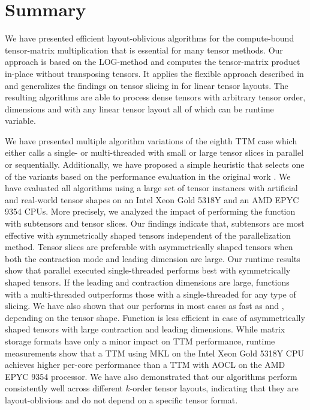 \section{Summary}
\label{sec:summary}
We have presented efficient layout-oblivious algorithms for the compute-bound tensor-matrix multiplication that is essential for many tensor methods.
Our approach is based on the LOG-method and computes the tensor-matrix product in-place without transposing tensors.
It applies the flexible approach described in \cite{bassoy:2019:ttv} and generalizes the findings on tensor slicing in \cite{li:2015:input} for linear tensor layouts.
The resulting algorithms are able to process dense tensors with arbitrary tensor order, dimensions and with any linear tensor layout all of which can be runtime variable.

We have presented multiple algorithm variations of the eighth TTM case which either calls a single- or multi-threaded  with small or large tensor slices in parallel or sequentially.
Additionally, we have proposed a simple heuristic that selects one of the variants based on the performance evaluation in the original work \cite{bassoy:2024:ttm}.
We have evaluated all algorithms using a large set of tensor instances with artificial and real-world tensor shapes on an Intel Xeon Gold 5318Y and an AMD EPYC 9354 CPUs.
More precisely, we analyzed the impact of performing the  function with subtensors and tensor slices.
Our findings indicate that, subtensors are most effective with symmetrically shaped tensors independent of the parallelization method. 
Tensor slices are preferable with asymmetrically shaped tensors when both the contraction mode and leading dimension are large.
Our runtime results show that parallel executed single-threaded  performs best with symmetrically shaped tensors.
If the leading and contraction dimensions are large, functions with a multi-threaded  outperforms those with a single-threaded  for any type of slicing.
We have also shown that our  performs in most cases as fast as  and , depending on the tensor shape.
Function  is less efficient in case of asymmetrically shaped tensors with large contraction and leading dimensions.
While matrix storage formats have only a minor impact on TTM performance, runtime measurements show that a TTM using MKL on the Intel Xeon Gold 5318Y CPU achieves higher per-core performance than a TTM with AOCL on the AMD EPYC 9354 processor.
We have also demonstrated that our algorithms perform consistently well across different $k$-order tensor layouts, indicating that they are layout-oblivious and do not depend on a specific tensor format.

